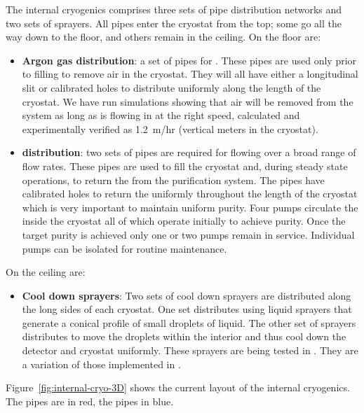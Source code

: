\label{sec:fdsp-tc-internal-cryo}

The internal cryogenics comprises three sets of pipe distribution networks and two sets of sprayers. All pipes enter the cryostat from the top; some go all the way down to the floor, and others remain in the ceiling. On the floor are:
\begin{itemize}
\item \textbf{Argon gas distribution}: a set of pipes 
for . These pipes are used only prior to filling to remove air 
in the cryostat. 
They will all have either a longitudinal slit or calibrated holes to distribute  uniformly along the length of the cryostat. 
We have run  simulations showing that air will be removed from the system as long as  is flowing in at the right speed, calculated and experimentally verified as \SI{1.2}{m/hr} (vertical meters in the cryostat).  


\item \textbf{ distribution}: two sets of pipes are required for flowing 
 over a broad  range of flow rates. These pipes are used to fill the cryostat and, during steady state operations, to return the  from the purification system. The pipes have calibrated holes to return the  uniformly throughout the length of the cryostat which is very important to maintain uniform purity. 
Four pumps circulate the  inside the cryostat all of which operate initially to achieve purity. 
Once the target purity is achieved only one or two pumps remain in service. Individual pumps can be isolated for routine maintenance.
\end{itemize}

On the ceiling are:

\begin{itemize}
\item \textbf{Cool down sprayers}: Two sets of cool down sprayers are distributed along the long sides of each cryostat. One set distributes  using liquid sprayers that generate a conical profile of small droplets of liquid. The other set of sprayers distributes  to move the  droplets within the interior and thus cool down the detector and cryostat uniformly. These sprayers are being tested in . They are a variation of those implemented in .
\end{itemize}

Figure~\ref{fig:internal-cryo-3D} shows the current layout of the internal cryogenics. 
The  pipes are in red, the  pipes in blue.

